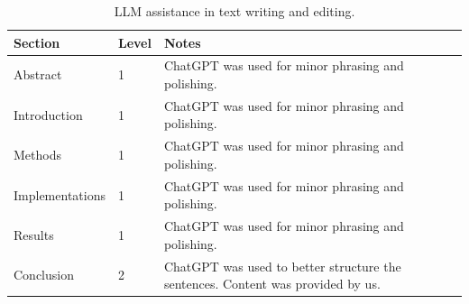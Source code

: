 \documentclass[amssymb,twocolumn,aps]{revtex4}
\begin{document}
\begin{table}[t]
    \centering
    \small
    \begin{tabular}{p{}p{}p{}}
        \hline
        \textbf{Section} & \textbf{Level} & \textbf{Notes} \\
        \hline
        Abstract
        & 1
        & ChatGPT was used for minor phrasing and polishing. \\

        \hline
        Introduction
        & 1
        & ChatGPT was used for minor phrasing and polishing. \\

        \hline
        Methods
        & 1
        & ChatGPT was used for minor phrasing and polishing. \\
        
        \hline
        Implementations
        & 1
        & ChatGPT was used for minor phrasing and polishing. \\
        
        \hline
        Results
        & 1
        & ChatGPT was used for minor phrasing and polishing. \\

        \hline
        Conclusion
        & 2
        & ChatGPT was used to better structure the sentences. Content was provided by us. \\ 
        \hline
     \end{tabular}
    \caption{LLM assistance in text writing and editing.}
    \label{tab:llm-text}
\end{table}
\end{document}
